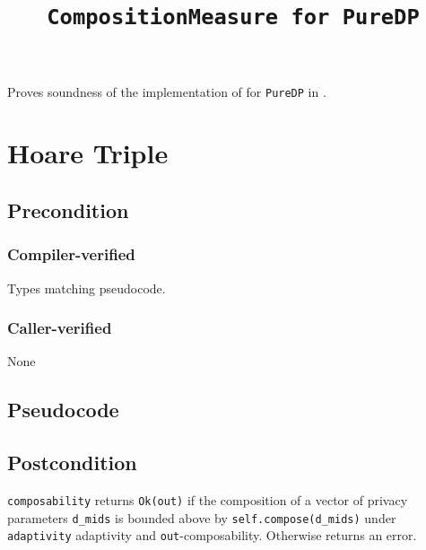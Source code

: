 \documentclass{article}
\title{\texttt{CompositionMeasure for PureDP}}
\author{\MichaelShoemateAuthor}
\date{}
\begin{document}
\maketitle

\contrib
Proves soundness of the implementation of  
for \texttt{PureDP} in .

\section{Hoare Triple}
\subsection*{Precondition}
\subsubsection*{Compiler-verified}
Types matching pseudocode.


\subsubsection*{Caller-verified}
None

\subsection*{Pseudocode}


\subsection*{Postcondition}
\begin{theorem}
  \texttt{composability} returns \texttt{Ok(out)} if the composition of a vector of privacy parameters \texttt{d\_mids} 
  is bounded above by \texttt{self.compose(d\_mids)} under \texttt{adaptivity} adaptivity and \texttt{out}-composability.
  Otherwise returns an error.
\end{theorem}
\end{document}
